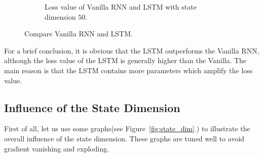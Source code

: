 \documentclass[12pt,letterpaper]{article}
\begin{document}
\begin{figure}[h]
\begin{subfigure}{0.4\textwidth}
    \caption{\small Loss value of Vanilla RNN and LSTM with state dimension $50$.} \label{fig:b}
    \end{subfigure}
    \caption{Compare Vanilla RNN and LSTM.}
    \label{fig:comparison}
\end{figure}

For a brief conclusion, it is obvious that the LSTM outperforms the Vanilla RNN, although the loss value of the LSTM is generally higher than the Vanilla. The main reason is that the LSTM contains more parameters which amplify the loss value.

\subsection*{Influence of the State Dimension}

First of all, let us use some graphs(see Figure~\ref{fig:state_dim}.) to illustrate the overall influence of the state dimension. These graphs are tuned well to avoid gradient vanishing and exploding.
\end{document}
